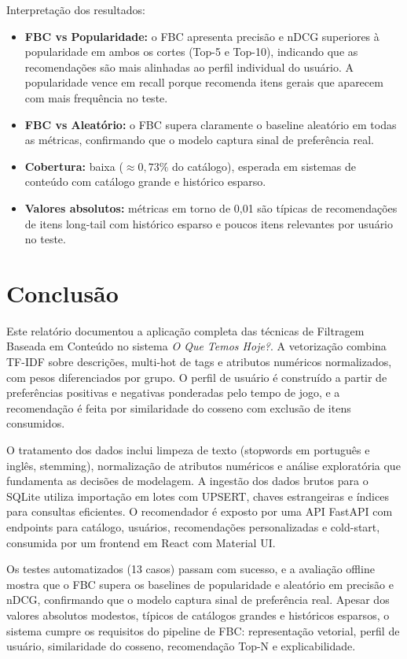 \documentclass[12pt,a4paper]{article}
\begin{document}
Interpretação dos resultados:

\begin{itemize}
    \item \textbf{FBC vs Popularidade:} o FBC apresenta precisão e nDCG superiores à popularidade em ambos os cortes (Top-5 e Top-10), indicando que as recomendações são mais alinhadas ao perfil individual do usuário. A popularidade vence em recall porque recomenda itens gerais que aparecem com mais frequência no teste.
    \item \textbf{FBC vs Aleatório:} o FBC supera claramente o baseline aleatório em todas as métricas, confirmando que o modelo captura sinal de preferência real.
    \item \textbf{Cobertura:} baixa ($\approx 0,73\%$ do catálogo), esperada em sistemas de conteúdo com catálogo grande e histórico esparso.
    \item \textbf{Valores absolutos:} métricas em torno de 0,01 são típicas de recomendações de itens long-tail com histórico esparso e poucos itens relevantes por usuário no teste.
\end{itemize}

\section{Conclusão}

Este relatório documentou a aplicação completa das técnicas de Filtragem Baseada em Conteúdo no sistema \textit{O Que Temos Hoje?}. A vetorização combina TF-IDF sobre descrições, multi-hot de tags e atributos numéricos normalizados, com pesos diferenciados por grupo. O perfil de usuário é construído a partir de preferências positivas e negativas ponderadas pelo tempo de jogo, e a recomendação é feita por similaridade do cosseno com exclusão de itens consumidos.

O tratamento dos dados inclui limpeza de texto (stopwords em português e inglês, stemming), normalização de atributos numéricos e análise exploratória que fundamenta as decisões de modelagem. A ingestão dos dados brutos para o SQLite utiliza importação em lotes com UPSERT, chaves estrangeiras e índices para consultas eficientes. O recomendador é exposto por uma API FastAPI com endpoints para catálogo, usuários, recomendações personalizadas e cold-start, consumida por um frontend em React com Material UI.

Os testes automatizados (13 casos) passam com sucesso, e a avaliação offline mostra que o FBC supera os baselines de popularidade e aleatório em precisão e nDCG, confirmando que o modelo captura sinal de preferência real. Apesar dos valores absolutos modestos, típicos de catálogos grandes e históricos esparsos, o sistema cumpre os requisitos do pipeline de FBC: representação vetorial, perfil de usuário, similaridade do cosseno, recomendação Top-N e explicabilidade.
\end{document}
